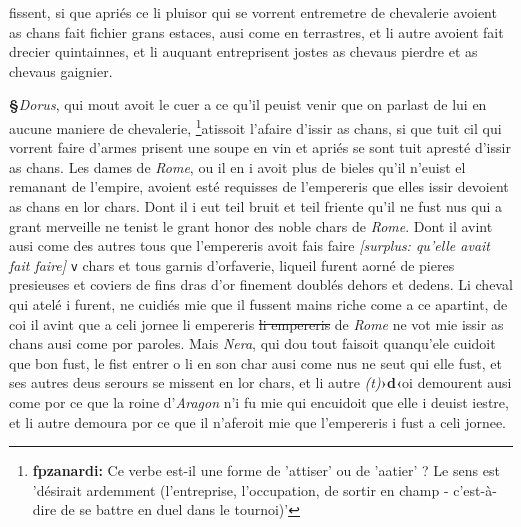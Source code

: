 \documentclass[12pt]{article} %
\newcommand{\persName}[1]{\emph{#1}} %
\newcommand{\placeName}[1]{\emph{#1}} %
\newcommand{\num}[1]{\texttt{#1}}    %
\newcommand{\corr}[2]{\emph{(#1)}\textbf{›#2‹}} %
\newcommand{\supplied}[1]{\textlangle#1\textrangle} %
\newcommand{\fnfpz}[1]{\footnote{\textbf{fpzanardi:} #1}} %
\newcommand{\del}[1]{\sout{#1}}      %
\newcommand{\surplus}[1]{\textit{[surplus: #1]}} %
\newcounter{paranum}
\newcommand{\pnum}{\stepcounter{paranum}\textbf{§\arabic{paranum}}\quad}
\begin{document}
fissent, si que apriés ce li pluisor qui se vorrent entremetre de chevalerie avoient as chans fait fichier grans estaces, ausi come en terrastres, et li autre avoient fait drecier quintainnes, et li auquant entreprisent jostes as chevaus pierdre et as chevaus gaignier.


\pnum \persName{Dorus}, qui mout avoit le cuer a ce qu'il peuist venir que on parlast de lui en aucune maniere de chevalerie, \fnfpz{Ce verbe est-il une forme de 'attiser' ou de 'aatier' ? Le sens est 'désirait ardemment (l'entreprise, l'occupation, de sortir en champ - c'est-à-dire de se battre en duel dans le tournoi)'}atissoit l'afaire d'issir as chans, si que tuit cil qui vorrent faire d'armes prisent une soupe en vin et apriés se sont tuit apresté d'issir as chans. Les dames de \placeName{Rome}, ou il en i avoit plus de bieles qu'il n'euist el remanant de l'empire, avoient esté requisses de l'empereris que elles issir devoient as chans en lor chars. Dont il i eut teil bruit et teil friente qu'il ne fust nus qui a grant merveille ne tenist le grant honor des noble chars de \placeName{Rome}. Dont il avint ausi come des autres tous que l'empereris avoit fais faire \surplus{qu'elle avait fait faire} \num{v} chars et tous garnis d'orfaverie, liqueil fure\supplied{n}t aorné de pieres presieuses et coviers de fins dras d'or finement doublés dehors et dedens. Li cheval qui atelé i furent, ne cuidiés mie que il fussent mains riche come a ce apartint, de coi il avint que a celi jornee li empereris \del{li empereris} de \placeName{Rome} ne vot mie issir as chans ausi come por paroles. Mais \persName{Nera}, qui dou tout faisoit quanqu'ele cuidoit que bon fust, le fist entrer o li en son char ausi come nus ne seut qui elle fust, et ses autres deus serours se missent en lor chars, et li autre \corr{t}{d}oi demourent ausi come por ce que la roine d'\placeName{Aragon} n'i fu mie qui encuidoit que elle i deuist iestre, et li autre demoura por ce que il n'aferoit mie que l'empereris i fust a celi jornee.
\end{document}
